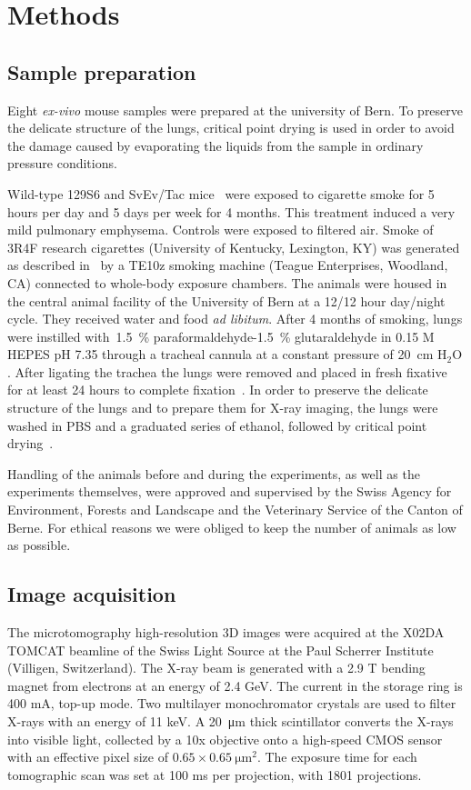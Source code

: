 \section{Methods}\label{sec:methods}
\subsection{Sample preparation}
Eight \emph{ex-vivo} mouse samples were prepared at the university of Bern.
To preserve the delicate structure of the lungs, critical point
drying is used in order to avoid the damage caused by evaporating the liquids
from the sample in ordinary pressure conditions.

Wild-type 129S6 and SvEv/Tac mice~\parencite{dai} were exposed to
cigarette smoke for 5 hours per day and 5 days per week for 4 months. This
treatment induced a very mild pulmonary emphysema. Controls were exposed to
filtered air. Smoke of 3R4F research cigarettes (University of Kentucky,
Lexington, KY) was generated as described in~\cite{cremona} by a
TE10z smoking machine (Teague Enterprises, Woodland, CA) connected to
whole-body exposure chambers. The animals were housed in the central animal
facility of the University of Bern at a 12/12 hour day/night cycle. They
received water and food \emph{ad libitum}. After 4 months of smoking, lungs were
instilled with~\SI{1.5}{\percent} paraformaldehyde-\SI{1.5}{\percent}
glutaraldehyde in 0.15 M HEPES pH 7.35 through a tracheal cannula at a
constant pressure of \SI{20}{\centi\meter} $\text{H}_2\text{O}$. After
ligating the trachea the lungs were removed and placed in fresh fixative for
at least 24 hours to complete fixation~\parencite{cremona}. In order to
preserve the delicate structure of the lungs and to prepare them for X-ray
imaging, the lungs were washed in PBS and a graduated series of ethanol,
followed by critical point drying~\parencite{kaeslin,barre}.

Handling of the animals before and during the experiments, as well as the
experiments themselves, were approved and supervised by the Swiss Agency for
Environment, Forests and Landscape and the Veterinary Service of the Canton
of Berne. For ethical reasons we were obliged to keep the number of animals
as low as possible.

\subsection{Image acquisition}\label{sec:acquisition}
The microtomography high-resolution 3D images were acquired at the X02DA
TOMCAT beamline of the Swiss Light Source at the Paul Scherrer Institute
(Villigen, Switzerland). The X-ray beam is generated with a 2.9 T bending
magnet from electrons at an energy of 2.4 GeV. The current in the storage
ring is 400 mA, top-up mode. Two multilayer monochromator crystals are used
to filter X-rays with an energy of 11 keV. A \SI{20}{\micro\meter} thick scintillator
converts the X-rays into visible light, collected by a 10x objective onto a
high-speed CMOS sensor with an effective pixel size of $0.65 \times
\SI{0.65}{\micro\meter\squared}$. The exposure time for each tomographic
scan was set at 100 ms per projection, with 1801 projections.

